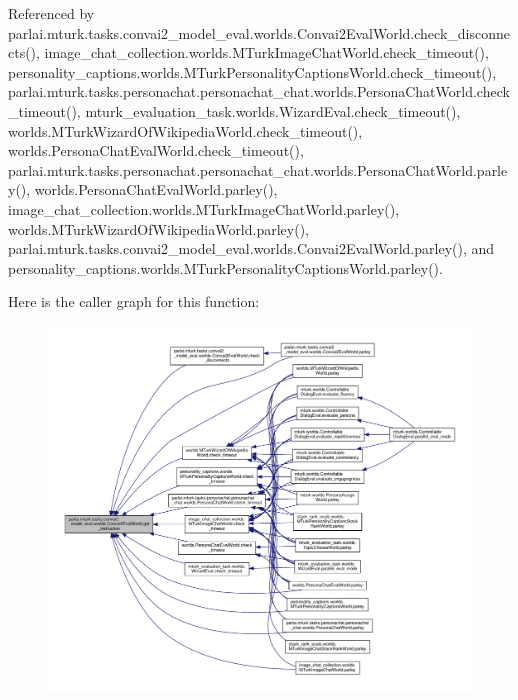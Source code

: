 Referenced by parlai.\+mturk.\+tasks.\+convai2\+\_\+model\+\_\+eval.\+worlds.\+Convai2\+Eval\+World.\+check\+\_\+disconnects(), image\+\_\+chat\+\_\+collection.\+worlds.\+M\+Turk\+Image\+Chat\+World.\+check\+\_\+timeout(), personality\+\_\+captions.\+worlds.\+M\+Turk\+Personality\+Captions\+World.\+check\+\_\+timeout(), parlai.\+mturk.\+tasks.\+personachat.\+personachat\+\_\+chat.\+worlds.\+Persona\+Chat\+World.\+check\+\_\+timeout(), mturk\+\_\+evaluation\+\_\+task.\+worlds.\+Wizard\+Eval.\+check\+\_\+timeout(), worlds.\+M\+Turk\+Wizard\+Of\+Wikipedia\+World.\+check\+\_\+timeout(), worlds.\+Persona\+Chat\+Eval\+World.\+check\+\_\+timeout(), parlai.\+mturk.\+tasks.\+personachat.\+personachat\+\_\+chat.\+worlds.\+Persona\+Chat\+World.\+parley(), worlds.\+Persona\+Chat\+Eval\+World.\+parley(), image\+\_\+chat\+\_\+collection.\+worlds.\+M\+Turk\+Image\+Chat\+World.\+parley(), worlds.\+M\+Turk\+Wizard\+Of\+Wikipedia\+World.\+parley(), parlai.\+mturk.\+tasks.\+convai2\+\_\+model\+\_\+eval.\+worlds.\+Convai2\+Eval\+World.\+parley(), and personality\+\_\+captions.\+worlds.\+M\+Turk\+Personality\+Captions\+World.\+parley().

Here is the caller graph for this function\+:
\nopagebreak
\begin{figure}[H]
\begin{center}
\leavevmode
\includegraphics[width=350pt]{classparlai_1_1mturk_1_1tasks_1_1convai2__model__eval_1_1worlds_1_1Convai2EvalWorld_a297aba27c40c516873f178758c503079_icgraph}
\end{center}
\end{figure}
\mbox{\label{classparlai_1_1mturk_1_1tasks_1_1convai2__model__eval_1_1worlds_1_1Convai2EvalWorld_af615b8beec269ea925c371b955669770}} 
